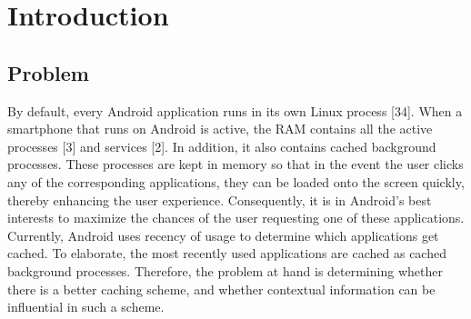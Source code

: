 \documentclass[12pt]{uthesis-v12}  %
\begin{document}

\chapter{Introduction}
	
	\section{Problem}
		 By default, every Android application runs in its own Linux process [34]. When a smartphone that runs on Android is active, the RAM contains all the active processes [3] and services [2]. In addition, it also contains cached background processes. These processes are kept in memory so that in the event the user clicks any of the corresponding applications, they can be loaded onto the screen quickly, thereby enhancing the user experience. Consequently, it is in Android's best interests to maximize the chances of the user requesting one of these applications. Currently, Android uses recency of usage to determine which applications get cached. To elaborate, the most recently used applications are cached as cached background processes. Therefore, the problem at hand is determining whether there is a better caching scheme, and whether contextual information can be influential in such a scheme.
		
\end{document}
